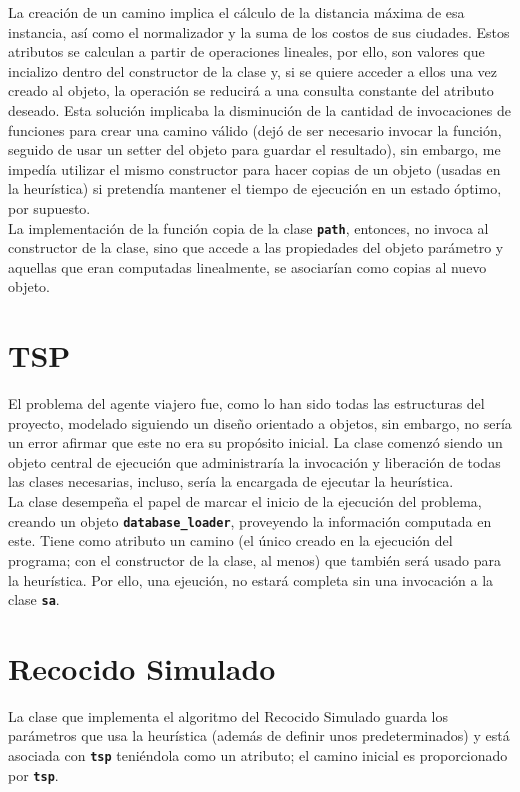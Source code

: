 \documentclass[a4paper]{report}
\begin{document}
La creaci\'on de un camino implica el c\'alculo de la distancia m\'axima de esa instancia, as\'i como el
normalizador y la suma de los costos de sus ciudades. Estos atributos se calculan a partir de operaciones
lineales, por ello, son valores que incializo dentro del constructor de la clase y, si se quiere acceder
a ellos una vez creado al objeto, la operaci\'on se reducir\'a a una consulta constante del atributo deseado.
Esta soluci\'on implicaba la disminuci\'on de la cantidad de invocaciones de funciones para
crear una camino v\'alido (dej\'o de ser necesario invocar la funci\'on, seguido de usar un setter del
objeto para guardar el resultado), sin embargo, me imped\'ia utilizar el mismo constructor para hacer copias
de un objeto (usadas en la heur\'istica) si pretend\'ia mantener el tiempo de ejecuci\'on en un estado
\'optimo, por supuesto.\\

La implementaci\'on de la funci\'on copia de la clase \textbf{\texttt{path}}, entonces, no invoca al
constructor de la clase, sino que accede a las propiedades del objeto par\'ametro y aquellas que eran
computadas linealmente, se asociar\'ian como copias al nuevo objeto.

\section{TSP}
El problema del agente viajero fue, como lo han sido todas las estructuras del proyecto, modelado siguiendo
un dise\~no orientado a objetos, sin embargo, no ser\'ia un error afirmar que este no era su prop\'osito inicial.
La clase comenz\'o siendo un objeto central de ejecuci\'on que administrar\'ia la invocaci\'on y liberaci\'on
de todas las clases necesarias, incluso, ser\'ia la encargada de ejecutar la heur\'istica.\\

La clase desempe\~na el papel de marcar el inicio de la ejecuci\'on del problema, creando un objeto
\textbf{\texttt{database\_loader}}, proveyendo la informaci\'on computada en este.
Tiene como atributo un camino (el \'unico creado en la ejecuci\'on del programa; con el constructor
de la clase, al menos) que tambi\'en ser\'a usado para la heur\'istica. Por ello, una ejeuci\'on,
no estar\'a completa sin una invocaci\'on a la clase \textbf{\texttt{sa}}.

\section{Recocido Simulado}
La clase que implementa el algoritmo del Recocido Simulado guarda los par\'ametros que usa la heur\'istica
(adem\'as de definir unos predeterminados) y est\'a asociada con \textbf{\texttt{tsp}} teni\'endola
como un atributo; el camino inicial es proporcionado por \textbf{\texttt{tsp}}.\\
\end{document}
